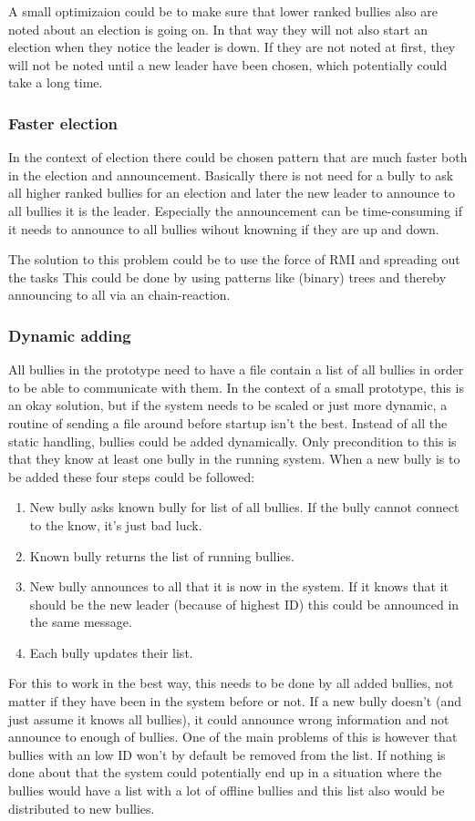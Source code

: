 \documentclass[Main]{subfiles}
\begin{document}
A small optimizaion could be to make sure that lower ranked bullies also are noted about an election is going on. In that way they will not also start an election when they notice the leader is down. If they are not noted at first, they will not be noted until a new leader have been chosen, which potentially could take a long time.

\subsubsection{Faster election}
In the context of election there could be chosen pattern that are much faster both in the election and announcement. Basically there is not need for a bully to ask all higher ranked bullies for an election and later the new leader to announce to all bullies it is the leader. Especially the announcement can be time-consuming if it needs to announce to all bullies wihout knowning if they are up and down.

The solution to  this problem could be to use the force of RMI and spreading out the tasks This could be done by using patterns like (binary) trees and thereby announcing to all via an chain-reaction.

\subsubsection{Dynamic adding}
All bullies in the prototype need to have a file contain a list of all bullies in order to be able to communicate with them. In the context of a small prototype, this is an okay solution, but if the system needs to be scaled or just more dynamic, a routine of sending a file around before startup isn't the best.
Instead of all the static handling, bullies could be added dynamically. Only precondition to this is that they know at least one bully in the running system. When a new bully is to be added these four steps could be followed:
\begin{enumerate}
\item New bully asks known bully for list of all bullies. If the bully cannot connect to the know, it's just bad luck.
\item Known bully returns the list of running bullies. 
\item New bully announces to all that it is now in the system. If it knows that it should be the new leader (because of highest ID) this could be announced in the same message.
\item Each bully updates their list.
\end{enumerate}
For this to work in the best way, this needs to be done by all added bullies, not matter if they have been in the system before or not. If a new bully doesn't (and just assume it knows all bullies), it could announce wrong information and not announce to enough of bullies. 
One of the main problems of this is however that bullies with an low ID won't by default be removed from the list. If nothing is done about that the system could potentially end up in a situation where the bullies would have a list with a lot of offline bullies and this list also would be distributed to new bullies.
\end{document}
